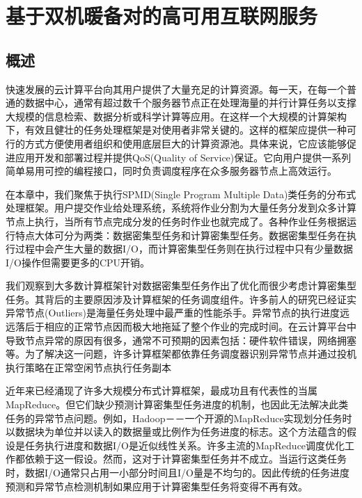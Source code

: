 \chapter{基于双机暖备对的高可用互联网服务}
\label{cha:gemini}

\section{概述}
\label{sec:gemini_intro}
快速发展的云计算平台向其用户提供了大量充足的计算资源。每一天，在每一个普通的数据中心，通常有超过数千个服务器节点正在处理海量的并行计算任务以支撑大规模的信息检索、数据分析或科学计算等应用。在这样一个大规模的计算架构下，有效且健壮的任务处理框架是对使用者非常关键的。这样的框架应提供一种可行的方式方便使用者组织和使用底层巨大的计算资源池。具体来说，它应该能够促进应用开发和部署过程并提供QoS(Quality of Service)保证。它向用户提供一系列简单易用可控的编程接口，同时负责调度程序在众多服务器节点上高效运行。

在本章中，我们聚焦于执行SPMD(Single Program Multiple Data)类任务的分布式处理框架。用户提交作业给处理系统，系统将作业分割为大量任务分发到众多计算节点上执行，当所有节点完成分发的任务时作业也就完成了。各种作业任务根据运行特点大体可分为两类：数据密集型任务和计算密集型任务。数据密集型任务在执行过程中会产生大量的数据I/O，而计算密集型任务则在执行过程中只有少量数据I/O操作但需要更多的CPU开销。

我们观察到大多数计算框架针对数据密集型任务作出了优化而很少考虑计算密集型任务。其背后的主要原因涉及计算框架的任务调度组件。许多前人的研究\cite{Zaharia:2008:IMP:1855741.1855744, Ananthanarayanan:2010:ROM:1924943.1924962}已经证实异常节点(Outliers)是海量任务处理中最严重的性能杀手。异常节点的执行进度远远落后于相应的正常节点因而极大地拖延了整个作业的完成时间。在云计算平台中导致节点异常的原因有很多，通常不可预期的因素包括：硬件软件错误，网络拥塞等。为了解决这一问题，许多计算框架都依靠任务调度器识别异常节点并通过投机执行策略在正常空闲节点执行任务副本

近年来已经涌现了许多大规模分布式计算框架，最成功且有代表性的当属MapReduce。但它们缺少预测计算密集型任务进度的机制，也因此无法解决此类任务的异常节点问题。例如，Hadoop－－一个开源的MapReduce实现划分任务时以数据块为单位并以读入的数据量或比例作为任务进度的标志。这个方法蕴含的假设是任务执行进度和数据I/O是近似线性关系。许多主流的MapReduce调度优化工作都依赖于这一假设。然而，这对于计算密集型任务并不成立。当运行这类任务时，数据I/O通常只占用一小部分时间且I/O量是不均匀的。因此传统的任务进度预测和异常节点检测机制如果应用于计算密集型任务将变得不再有效。

